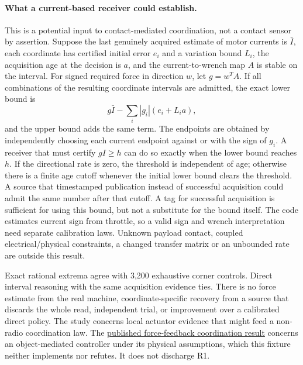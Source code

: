 \documentclass[11pt]{article}
\begin{document}
\paragraph{What a current-based receiver could establish.}
This is a potential input to contact-mediated coordination, not a contact sensor by assertion. Suppose the last genuinely acquired estimate of motor currents is $\bar I$, each coordinate has certified initial error $e_i$ and a variation bound $L_i$, the acquisition age at the decision is $a$, and the current-to-wrench map $A$ is stable on the interval. For signed required force in direction $w$, let $g=w^TA$. If all combinations of the resulting coordinate intervals are admitted, the exact lower bound is
\[
 g\bar I - \sum_i |g_i|(e_i+L_i a),
\]
and the upper bound adds the same term. The endpoints are obtained by independently choosing each current endpoint against or with the sign of $g_i$. A receiver that must certify $gI\geq h$ can do so exactly when the lower bound reaches $h$. If the directional rate is zero, the threshold is independent of age; otherwise there is a finite age cutoff whenever the initial lower bound clears the threshold. A source that timestamped publication instead of successful acquisition could admit the same number after that cutoff. A tag for successful acquisition is sufficient for using this bound, but not a substitute for the bound itself. The code estimates current sign from throttle, so a valid sign and wrench interpretation need separate calibration laws. Unknown payload contact, coupled electrical/physical constraints, a changed transfer matrix or an unbounded rate are outside this result.

Exact rational extrema agree with 3,200 exhaustive corner controls. Direct interval reasoning with the same acquisition evidence ties. There is no force estimate from the real machine, coordinate-specific recovery from a source that discards the whole read, independent trial, or improvement over a calibrated direct policy. The study concerns local actuator evidence that might feed a non-radio coordination law. The \href{https://msl.stanford.edu/papers/wang_kinematic_2016.pdf}{published force-feedback coordination result} concerns an object-mediated controller under its physical assumptions, which this fixture neither implements nor refutes. It does not discharge R1.
\end{document}

